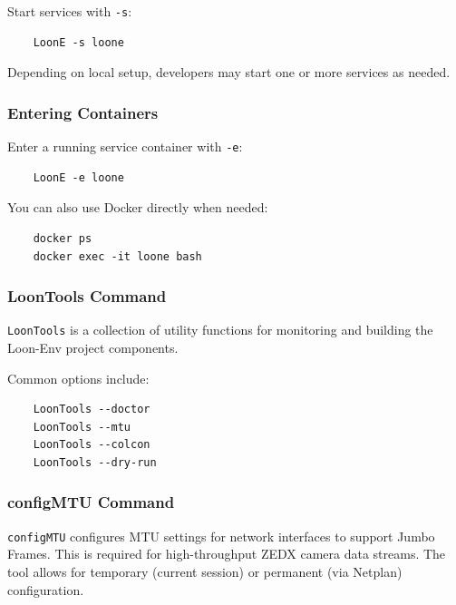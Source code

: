 Start services with \texttt{-s}:

\begin{verbatim}
    LoonE -s loone
\end{verbatim}

Depending on local setup, developers may start one or more services as needed.

\subsubsection{Entering Containers}

Enter a running service container with \texttt{-e}:

\begin{verbatim}
    LoonE -e loone
\end{verbatim}

You can also use Docker directly when needed:

\begin{verbatim}
    docker ps
    docker exec -it loone bash
\end{verbatim}


\subsubsection{LoonTools Command}

\texttt{LoonTools} is a collection of utility functions for monitoring and building the Loon-Env project components.

Common options include:

\begin{verbatim}
    LoonTools --doctor
    LoonTools --mtu
    LoonTools --colcon
    LoonTools --dry-run
\end{verbatim}


\subsubsection{configMTU Command}

\texttt{configMTU} configures MTU settings for network interfaces to support Jumbo Frames. This is required for high-throughput ZEDX camera data streams. The tool allows for temporary (current session) or permanent (via Netplan) configuration.

